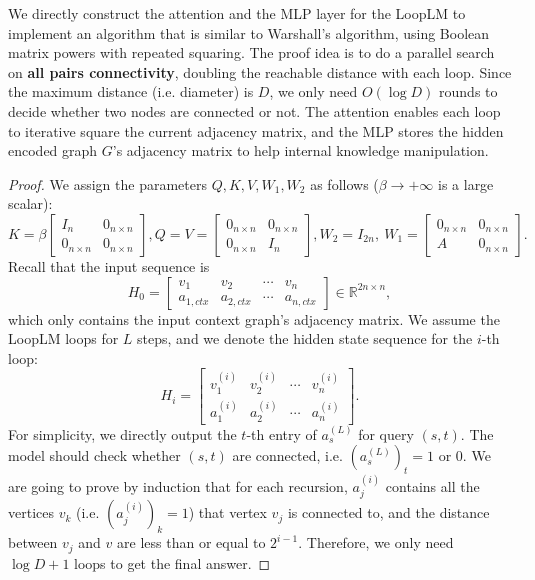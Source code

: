 \documentclass[]{bytedance_seed}
\newcommand{\R}{\mathbb{R}}
\newcommand{\1}{\mathbf{1}}
\newcommand{\ut}{LoopLM}
\begin{document}
We directly construct the attention and the MLP layer for the \ut{} to implement an algorithm that is similar to Warshall’s algorithm, using Boolean matrix powers with repeated squaring. The proof idea is to do a parallel search on \textbf{all pairs connectivity}, doubling the reachable distance with each loop. Since the maximum distance (i.e. diameter) is $D$, we only need $O(\log D)$ rounds to decide whether two nodes are connected or not. The attention enables each loop to iterative square the current adjacency matrix, and the MLP stores the hidden encoded graph $G$'s adjacency matrix to help internal knowledge manipulation.
\begin{proof}
    We assign the parameters $Q,K,V,W_1,W_2$ as follows ($\beta\to +\infty$ is a large scalar):
    $$K=\beta\begin{bmatrix}
        I_n&0_{n\times n}\\0_{n\times n}&0_{n\times n}
    \end{bmatrix}, Q= V=\begin{bmatrix}
        0_{n\times n}&0_{n\times n}\\
        0_{n\times n}&I_n
    \end{bmatrix}, W_2 = I_{2n},\ W_1 = \begin{bmatrix}
        0_{n\times n}&0_{n\times n}\\
        A&0_{n\times n}
    \end{bmatrix}.$$
    Recall that the input sequence is
    $$H_0=\begin{bmatrix}
    v_1 &v_2&\cdots&v_n\\
    a_{1,ctx}&a_{2,ctx}&\cdots&a_{n,ctx}\end{bmatrix}\in \R^{2n\times n},$$
    which only contains the input context graph's adjacency matrix.
    We assume the \ut{} loops for $L$ steps, and we denote the hidden state sequence for the $i$-th loop:
    $$H_i=\begin{bmatrix}
        v_1^{(i)} &v_2^{(i)}&\cdots&v_n^{(i)}\\
        a_{1}^{(i)}&a_{2}^{(i)}&\cdots&a_{n}^{(i)}\end{bmatrix}.$$
    For simplicity, we directly output the $t$-th entry of $a_{s}^{(L)}$ for query $(s,t)$.
    The model should check whether $(s,t)$ are connected, i.e. $(a_s^{(L)})_t=1$ or $0$.
    We are going to prove by induction that for each recursion, $a_j^{(i)}$ contains all the vertices $v_k$ (i.e. $(a_j^{(i)})_k=1$)  that vertex $v_j$ is connected to, and the distance between $v_j$ and $v$ are less than or equal to $2^{i-1}$. Therefore, we only need $\log D+1$ loops to get the final answer. 


\end{proof}
\end{document}

